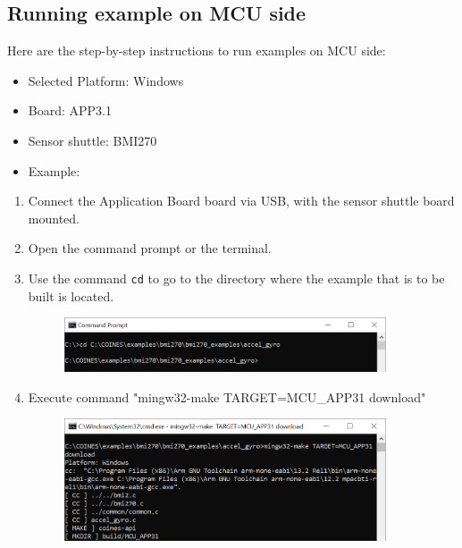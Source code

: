 \documentclass{article}
\begin{document}
\subsection{Running example on MCU side}
Here are the step-by-step instructions to run examples on MCU side:
\begin{itemize}
	\item Selected Platform: Windows
	\item Board: APP3.1
	\item Sensor shuttle: BMI270
	\item Example: 
\end{itemize}
\begin{enumerate}
	\item Connect the Application Board board via USB, with the sensor shuttle board mounted.
	\item Open the command prompt or the terminal.
	\item Use the command \texttt{cd} to go to the directory where the example that is to be built is located.
	\begin{figure}[H]
		\begin{center}
			\includegraphics[width=0.9\textwidth]{coinesAPI_images/Mcu_example_cd.png}
		\end{center}
	\end{figure}
	\item Execute command "mingw32-make TARGET=MCU\_APP31 download"
	\begin{figure}[H]
		\begin{center}
			\includegraphics[width=0.9\textwidth]{coinesAPI_images/Mcu_example_compile.png}
		\end{center}
	\end{figure}
	\begin{figure}[H]

\end{figure}
\end{enumerate}
\end{document}

